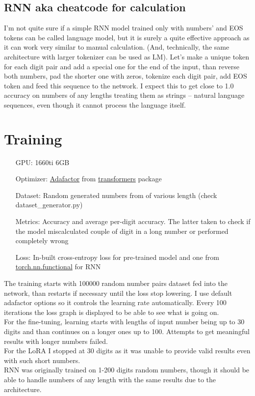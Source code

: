 \documentclass[a4paper,12pt]{article}
\begin{document}
		\subsection{RNN aka cheatcode for calculation}
			I'm not quite sure if a simple RNN model trained only with numbers' and EOS tokens can be called language model, but it is surely a quite effective approach as it can work very similar to manual calculation. (And, technically, the same architecture with larger tokenizer can be used as LM). Let's make a unique token for each digit pair and add a special one for the end of the input, than reverse both numbers, pad the shorter one with zeros, tokenize each digit pair, add EOS token and feed this sequence to the network. I expect this to get close to 1.0 accuracy on numbers of any lengths treating them as strings -- natural language sequences, even though it cannot process the language itself. 		
			
	\section{Training}
		\begin{itemize}
			\item[GPU:] 1660ti 6GB
			\item[Optimizer:] \href{https://arxiv.org/abs/1804.04235}{Adafactor} from \href{https://huggingface.co/docs/transformers/main_classes/optimizer_schedules}{transformers} package
			\item[Dataset:] Random generated numbers from of various length (check dataset\_generator.py)
			\item[Metrics:] Accuracy and average per-digit accuracy. The latter taken to check if the model miscalculated couple of digit in a long number or performed completely wrong
			\item[Loss:] In-built cross-entropy loss for pre-trained model and one from \href{https://pytorch.org/docs/stable/nn.functional.html}{torch.nn.functional} for RNN
		\end{itemize}
		The training starts with 100000 random number pairs dataset fed into the network, than restarts if necessary until the loss stop lowering. I use default adafactor options so it controls the learning rate automatically. Every 100 iterations the loss graph is displayed to be able to see what is going on. \\
		For the fine-tuning, learning starts with lengths of input number being up to 30 digits and than continues on a longer ones up to 100. Attempts to get meaningful results with longer numbers failed.\\
		For the LoRA  I stopped at 30 digits as it was unable to provide valid results even with such short numbers.\\
		RNN was originally trained on 1-200 digits random numbers, though it should be able to handle numbers of any length with the same results due to the architecture.
\end{document}
